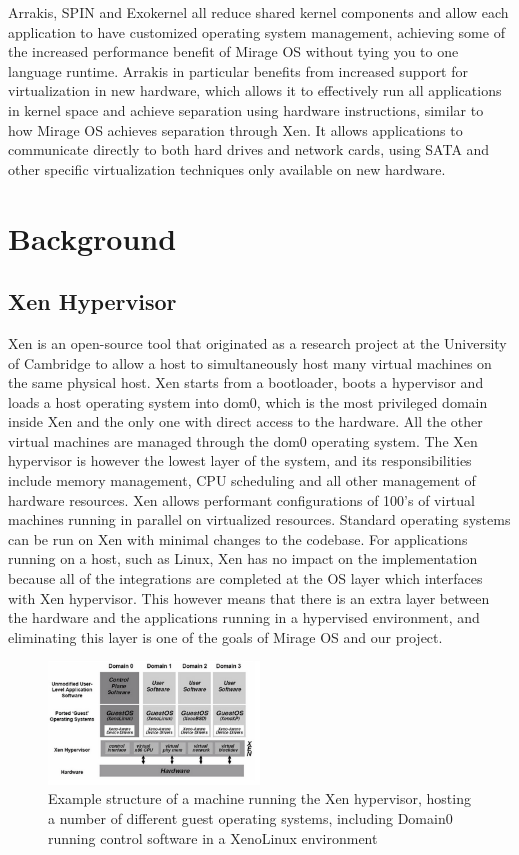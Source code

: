 \documentclass[english,10pt,twocolumn]{article}
\begin{document}
Arrakis\cite{arrakis}, SPIN\cite{spin} and Exokernel\cite{exokernel} all reduce shared kernel components and allow each application to have customized operating system management, achieving some of the increased performance benefit of Mirage OS without tying you to one language runtime.
Arrakis in particular benefits from increased support for virtualization in new hardware, which allows it to effectively run all applications in kernel space and achieve separation using hardware instructions, similar to how Mirage OS achieves separation through Xen.
It allows applications to communicate directly to both hard drives and network cards, using SATA and other specific virtualization techniques only available on new hardware.

\section{Background}

\subsection{Xen Hypervisor}

Xen is an open-source tool that originated as a research project at the University of Cambridge to allow a host to simultaneously host many virtual machines on the same physical host.
Xen starts from a bootloader, boots a hypervisor and loads a host operating system into dom0, which is the most privileged domain inside Xen and the only one with direct access to the hardware.
All the other virtual machines are managed through the dom0 operating system.
The Xen hypervisor is however the lowest layer of the system, and its responsibilities include memory management, CPU scheduling and all other management of hardware resources.
Xen allows performant configurations of 100's of virtual machines running in parallel on virtualized resources.
Standard operating systems can be run on Xen with minimal changes to the codebase.
For applications running on a host, such as Linux, Xen has no impact on the implementation because all of the integrations are completed at the OS layer which interfaces with Xen hypervisor.
This however means that there is an extra layer between the hardware and the applications running in a hypervised environment, and eliminating this layer is one of the goals of Mirage OS and our project.

\begin{figure}[ht]
  \centering
  \caption{Example structure of a machine running the Xen hypervisor,
hosting a number of different guest operating systems,
including Domain0 running control software in a XenoLinux
environment \cite{xen}}
  \includegraphics[width=0.5\textwidth]{images/xen}
\end{figure}
\end{document}

